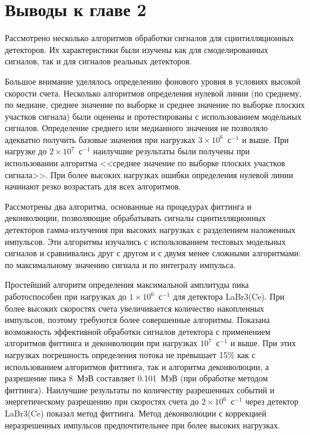 
\FloatBarrier
\section{Выводы к главе 2}

Рассмотрено несколько алгоритмов обработки сигналов для сцинтилляционных детекторов. Их характеристики были изучены как для смоделированных сигналов, так и для сигналов реальных детекторов.

Большое внимание уделялось определению фонового уровня в условиях высокой скорости счета. Несколько алгоритмов определения нулевой линии (по среднему, по медиане, среднее значение по выборке и среднее значение по выборке плоских участков сигнала) были оценены и протестированы с использованием модельных сигналов. Определение среднего или медианного значения не позволяло адекватно получить базовые значения при нагрузках $3 \times 10^6$~с${}^{-1}$ и выше. При нагрузке до $2 \times 10^7$~с${}^{-1}$ наилучшие результаты были получены при использовании алгоритма <<среднее значение по выборке плоских участков сигнала>>. При более высоких нагрузках ошибки определения нулевой линии начинают резко возрастать для всех алгоритмов.

Рассмотрены два алгоритма, основанные на процедурах фиттинга и деконволюции, позволяющие обрабатывать сигналы сцинтилляционных детекторов гамма-излучения при высоких нагрузках с разделением наложенных импульсов. Эти алгоритмы изучались с использованием тестовых модельных сигналов и сравнивались друг с другом и с двумя менее сложными алгоритмами: по максимальному значению сигнала и по интегралу импульса.

Простейший алгоритм определения максимальной амплитуды пика работоспособен при нагрузках до $1 \times 10^6$~с${}^{-1}$ для детектора LaBr3(Ce). При более высоких скоростях счета увеличивается количество накопленных импульсов, поэтому требуются более совершенные алгоритмы. Показана возможность эффективной обработки сигналов детектора с применением алгоритмов фиттинга и деконволюции при нагрузках $10^7$~с${}^{-1}$ и выше. При этих нагрузках погрешность определения потока не превышает 15\% как с использованием алгоритмов фиттинга, так и алгоритма деконволюции, а разрешение пика 8~МэВ составляет 0.101~МэВ (при обработке методом фиттинга). Наилучшие результаты по количеству разрешенных событий и энергетическому разрешению при скоростях счета до $2 \times 10^6$~с${}^{-1}$ через детектор LaBr3(Ce) показал метод фиттинга. Метод деконволюции с коррекцией неразрешенных импульсов предпочтительнее при более высоких нагрузках.


